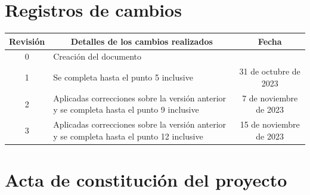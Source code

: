 \documentclass[
11pt, %
]{Clases/charter}
\begin{document}
\maketitle
\thispagestyle{empty}
\pagebreak


\thispagestyle{empty}
{\setlength{\parskip}{0pt}
	\tableofcontents{}
}
\pagebreak


\section*{Registros de cambios}
\label{sec:registro}


\begin{table}[ht]
	\label{tab:registro}
	\centering
	\begin{tabularx}{\linewidth}{@{}|c|X|c|@{}}
		\hline
		\rowcolor[HTML]{C0C0C0}
		Revisión & \multicolumn{1}{c|}{\cellcolor[HTML]{C0C0C0}Detalles de los cambios realizados}            & Fecha                   \\ \hline
		0        & Creación del documento                                                                     & \fechaInicioName        \\ \hline
		1        & Se completa hasta el punto 5 inclusive                                                     & 31 de octubre de 2023   \\ \hline
		2        & Aplicadas correcciones sobre la versión anterior y se completa hasta el punto 9 inclusive  & 7 de noviembre de 2023  \\ \hline
		3        & Aplicadas correcciones sobre la versión anterior y se completa hasta el punto 12 inclusive & 15 de noviembre de 2023 \\ \hline
	\end{tabularx}
\end{table}

\pagebreak



\section*{Acta de constitución del proyecto}
\label{sec:acta}
\end{document}
